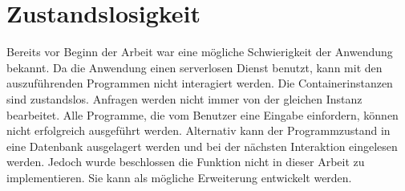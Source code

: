 \section{Zustandslosigkeit}
Bereits vor Beginn der Arbeit war eine mögliche Schwierigkeit
der Anwendung bekannt. Da die Anwendung einen serverlosen Dienst
benutzt, kann mit den auszuführenden Programmen nicht
interagiert werden. Die Containerinstanzen sind zustandslos.
Anfragen werden nicht immer von der gleichen Instanz bearbeitet.
Alle Programme, die vom Benutzer eine Eingabe einfordern,
können nicht erfolgreich ausgeführt werden. Alternativ
kann der Programmzustand in eine Datenbank ausgelagert werden
und bei der nächsten Interaktion eingelesen werden.
Jedoch wurde beschlossen die Funktion nicht in dieser Arbeit zu
implementieren. Sie kann als mögliche Erweiterung entwickelt
werden.
